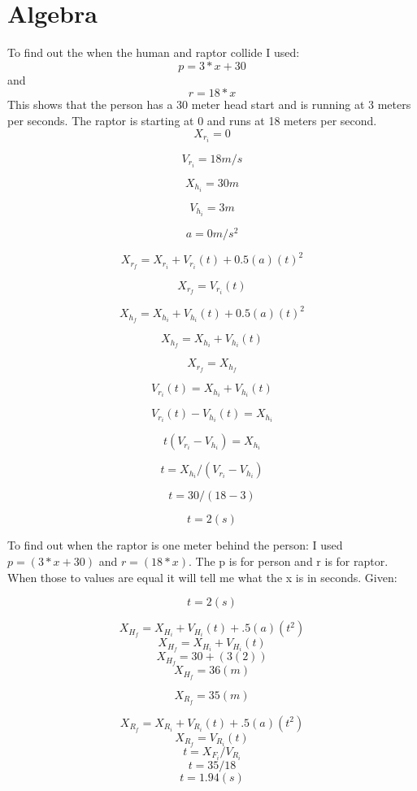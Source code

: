 \documentclass[twocolumn]{revtex4}
\begin{document}
\section{Algebra}
To find out the when the human and raptor collide I used:
$$p = 3 * x + 30$$
and
$$r = 18 * x$$
This shows that the person has a 30 meter head start and is running at 3 meters per seconds. The raptor is starting at 0 and runs at 18 meters per second.
$$X_r_i = 0$$

$$V_r_i = 18 m/s$$

$$X_h_i = 30 m$$

$$V_h_i = 3 m$$

$$a = 0 m/s^2$$

$$X_r_f = X_r_i + V_r_i(t) + 0.5(a)(t)^2$$

$$X_r_f = V_r_i(t)$$

$$X_h_f = X_h_i + V_h_i(t) + 0.5(a)(t)^2$$

$$X_h_f = X_h_i + V_h_i(t)$$

$$X_r_f = X_h_f$$

$$V_r_i(t) = X_h_i + V_h_i(t)$$

$$V_r_i(t) - V_h_i(t) = X_h_i$$

$$t(V_r_i - V_h_i) = X_h_i$$

$$t = X_h_i/(V_r_i - V_h_i)$$

$$t = 30/(18-3)$$

$$t = 2(s)$$

To find out when the raptor is one meter behind the person:
I used $p = (3* x + 30)$ and $r = (18 * x)$. The p is for person and r is for raptor. When those to values are equal it will tell me what the x is in seconds.
Given:

$$t = 2(s)$$

$$X_H_f = X_H_i + V_H_i(t) + .5(a)(t^2)$$
$$X_H_f = X_H_i + V_H_i(t)$$
$$X_H_f = 30 + (3(2))$$
$$X_H_f = 36 (m)$$

$$X_R_f = 35 (m)$$ 

$$X_R_f = X_R_i + V_R_i(t) + .5(a)(t^2)$$	
$$X_R_f = V_R_i(t)$$ 
$$t = X_F_i / V_R_i$$
$$t = 35 / 18$$
$$t = 1.94 (s)$$
\end{document}
